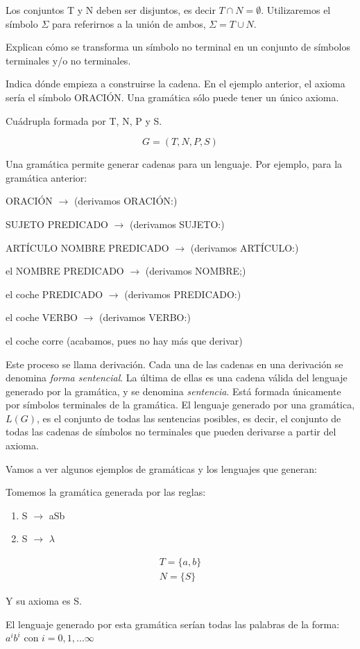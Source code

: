 \documentclass{apuntes}
\begin{document}
\noindent Los conjuntos T y N deben ser disjuntos, es decir $T \cap N = \emptyset$. Utilizaremos el símbolo $\Sigma$ para referirnos a la unión de ambos, $\Sigma = T \cup N$.

\begin{defn}
Explican cómo se transforma un símbolo no terminal en un conjunto de símbolos terminales y/o no terminales.
\end{defn}

\begin{defn}
Indica dónde empieza a construirse la cadena. En el ejemplo anterior, el axioma sería el símbolo ORACIÓN. Una gramática sólo puede tener un único axioma.
\end{defn}

\begin{defn}[Gramática (G)]
Cuádrupla formada por T, N, P y S.

\[ G = ( T, N, P, S) \]
\end{defn}

Una gramática permite generar cadenas para un lenguaje. Por ejemplo, para la gramática anterior:

ORACIÓN $\rightarrow$ (derivamos ORACIÓN:)

SUJETO PREDICADO $\rightarrow$ (derivamos SUJETO:)

ARTÍCULO NOMBRE PREDICADO $\rightarrow$ (derivamos ARTÍCULO:)

el NOMBRE PREDICADO $\rightarrow$ (derivamos NOMBRE;)

el coche PREDICADO $\rightarrow$ (derivamos PREDICADO:)

el coche VERBO $\rightarrow$ (derivamos VERBO:)

el coche corre (acabamos, pues no hay más que derivar)

Este proceso se llama derivación. Cada una de las cadenas en una derivación se denomina {\em forma sentencial}. La última de ellas es una cadena válida del lenguaje generado por la gramática, y se denomina {\em sentencia}. Está formada únicamente por símbolos terminales de la gramática. El lenguaje generado por una gramática, $L(G)$, es el conjunto de todas las sentencias posibles, es decir, el conjunto de todas las cadenas de símbolos no terminales que pueden derivarse a partir del axioma.

Vamos a ver algunos ejemplos de gramáticas y los lenguajes que generan:
\begin{example}
Tomemos la gramática generada por las reglas:
\begin{enumerate}
\item S $\rightarrow$ aSb
\item S $\rightarrow$ $\lambda$
\end{enumerate}

\begin{gather*}
T = \lbrace a, b \rbrace \\
N = \lbrace S \rbrace
\end{gather*}

Y su axioma es S.

El lenguaje generado por esta gramática serían todas las palabras de la forma: $a^i b^i$ con $ i=0,1,... \infty$
\end{example}
\end{document}
